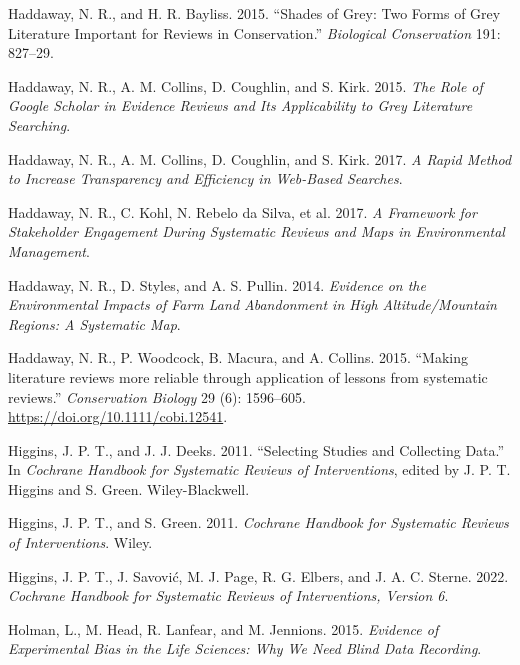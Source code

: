 \documentclass[
  letterpaper,
  DIV=11,
  numbers=noendperiod]{scrreprt}
\newlength{\cslhangindent}
\newenvironment{CSLReferences}[2] %
 {\begin{list}{}{%
  \setlength{\itemindent}{0pt}
  \setlength{\leftmargin}{0pt}
  \setlength{\parsep}{0pt}
  \ifodd #1
   \setlength{\leftmargin}{\cslhangindent}
   \setlength{\itemindent}{-1\cslhangindent}
  \fi
  \setlength{\itemsep}{#2\baselineskip}}}
 {\end{list}}
\begin{document}
\begin{CSLReferences}{1}{1}
Haddaway, N. R., and H. R. Bayliss. 2015. {``Shades of Grey: Two Forms
of Grey Literature Important for Reviews in Conservation.''}
\emph{Biological Conservation} 191: 827--29.

Haddaway, N. R., A. M. Collins, D. Coughlin, and S. Kirk. 2015.
\emph{The Role of Google Scholar in Evidence Reviews and Its
Applicability to Grey Literature Searching}.

Haddaway, N. R., A. M. Collins, D. Coughlin, and S. Kirk. 2017. \emph{A
Rapid Method to Increase Transparency and Efficiency in Web-Based
Searches}.

Haddaway, N. R., C. Kohl, N. Rebelo da Silva, et al. 2017. \emph{A
Framework for Stakeholder Engagement During Systematic Reviews and Maps
in Environmental Management}.

Haddaway, N. R., D. Styles, and A. S. Pullin. 2014. \emph{Evidence on
the Environmental Impacts of Farm Land Abandonment in High
Altitude/Mountain Regions: A Systematic Map}.

Haddaway, N. R., P. Woodcock, B. Macura, and A. Collins. 2015. {``Making
literature reviews more reliable through application of lessons from
systematic reviews.''} \emph{Conservation Biology} 29 (6): 1596--605.
\url{https://doi.org/10.1111/cobi.12541}.

Higgins, J. P. T., and J. J. Deeks. 2011. {``Selecting Studies and
Collecting Data.''} In \emph{Cochrane Handbook for Systematic Reviews of
Interventions}, edited by J. P. T. Higgins and S. Green.
Wiley-Blackwell.

Higgins, J. P. T., and S. Green. 2011. \emph{Cochrane Handbook for
Systematic Reviews of Interventions}. Wiley.

Higgins, J. P. T., J. Savović, M. J. Page, R. G. Elbers, and J. A. C.
Sterne. 2022. \emph{Cochrane Handbook for Systematic Reviews of
Interventions, Version 6}.

Holman, L., M. Head, R. Lanfear, and M. Jennions. 2015. \emph{Evidence
of Experimental Bias in the Life Sciences: Why We Need Blind Data
Recording}.


\end{CSLReferences}
\end{document}
